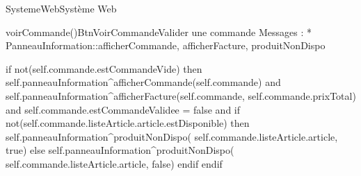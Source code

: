 \begin{OM}{SystemeWeb}{Système Web}

\begin{OMOperation}{voirCommande()}{BtnVoirCommande}{Valider une commande}
Messages :
* PanneauInformation::{afficherCommande, afficherFacture, produitNonDispo}
\begin{OMPre}
\end{OMPre}
\begin{OMPost}
        if not(self.commande.estCommandeVide) then
                self.panneauInformation^afficherCommande(self.commande)
                and
                self.panneauInformation^afficherFacture(self.commande, self.commande.prixTotal)
                and
                self.commande.estCommandeValidee = false
                and
                if not(self.commande.listeArticle.article.estDisponible) then
                        self.panneauInformation^produitNonDispo( self.commande.listeArticle.article, true)
                else
                        self.panneauInformation^produitNonDispo( self.commande.listeArticle.article, false)
                endif
        endif
                    \end{OMPost}
\end{OMOperation}


\end{OM}
